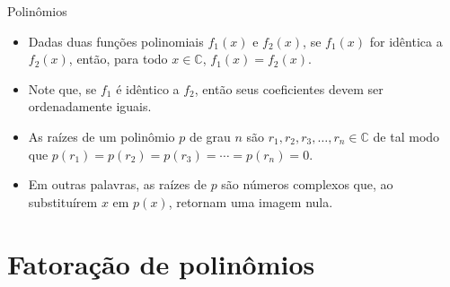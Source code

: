 \documentclass[14pt, aspectratio=169]{beamer}
\newcommand{\C}{\mathbb{C}}
\newcommand{\skipframe}{\vspace{10.0cm}}
\begin{document}
\begin{frame}[allowframebreaks]{Polinômios}
\begin{itemize}
    \item Dadas duas funções polinomiais $f_1(x)$ e $f_2(x)$, se $f_1(x)$ for idêntica a $f_2(x)$, então, para todo $x \in \C$, $f_1(x) = f_2(x)$.

    \item Note que, se $f_1$ é idêntico a $f_2$, então seus coeficientes devem ser ordenadamente iguais.

    \skipframe

    \item As raízes de um polinômio $p$ de grau $n$ são $r_1, r_2, r_3, \ldots, r_n \in \C$ de tal modo que $p(r_1) = p(r_2) = p(r_3) = \cdots = p(r_n) = 0$.

    \item Em outras palavras, as raízes de $p$ são números complexos que, ao substituírem $x$ em $p(x)$, retornam uma imagem nula.
\end{itemize}
    
\end{frame}

\section{Fatoração de polinômios}
\end{document}
